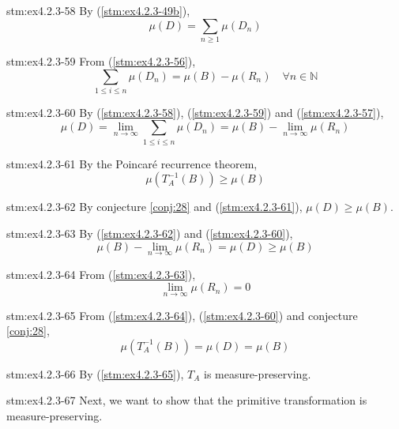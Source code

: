 \begin{statement}{stm:ex4.2.3-58}
By (\ref{stm:ex4.2.3-49b}), 
\[
\mu(D) = \sum_{n \ge 1} \mu(D_n)
\]
\end{statement}

\begin{statement}{stm:ex4.2.3-59}
From (\ref{stm:ex4.2.3-56}),
\[
\sum_{1 \le i \le n} \mu(D_n) = \mu(B) - \mu(R_n) \quad \forall n \in \mathbb{N}
\]
\end{statement}

\begin{statement}{stm:ex4.2.3-60}
By (\ref{stm:ex4.2.3-58}), (\ref{stm:ex4.2.3-59}) and (\ref{stm:ex4.2.3-57}),
\[
\mu(D) = \lim_{n \to \infty} \sum_{1 \le i \le n} \mu(D_n) = \mu(B) - \lim_{n \to \infty} \mu(R_n)
\]
\end{statement}

\begin{statement}{stm:ex4.2.3-61}
By the Poincaré recurrence theorem, 
\[
\mu(T_A^{-1}(B)) \ge \mu(B)
\]
\end{statement}

\begin{statement}{stm:ex4.2.3-62}
By conjecture \ref{conj:28} and (\ref{stm:ex4.2.3-61}), $\mu(D) \ge \mu(B)$.
\end{statement}

\begin{statement}{stm:ex4.2.3-63}
By (\ref{stm:ex4.2.3-62}) and (\ref{stm:ex4.2.3-60}), 
\[
\mu(B) - \lim_{n \to \infty} \mu(R_n) = \mu(D) \ge \mu(B)
\]
\end{statement}

\begin{statement}{stm:ex4.2.3-64}
From (\ref{stm:ex4.2.3-63}), 
\[
\lim_{n \to \infty} \mu(R_n) = 0
\]
\end{statement}

\begin{statement}{stm:ex4.2.3-65}
From (\ref{stm:ex4.2.3-64}), (\ref{stm:ex4.2.3-60}) and conjecture \ref{conj:28},
\[
\mu(T_A^{-1}(B)) = \mu(D) = \mu(B)
\]
\end{statement}

\begin{statement}{stm:ex4.2.3-66}
By (\ref{stm:ex4.2.3-65}), $T_A$ is measure-preserving.
\end{statement}

\begin{explanation}{stm:ex4.2.3-67}
Next, we want to show that the primitive transformation is measure-preserving.
\end{explanation}

